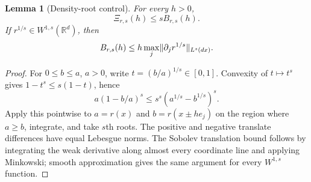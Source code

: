 \documentclass[11pt]{article}
\newtheorem{lemma}[theorem]{Lemma}
\theoremstyle{remark}\newtheorem{remark}[theorem]{Remark}
\newcommand{\R}{\mathbb R}\newcommand{\E}{\mathbb E}
\begin{document}
\begin{lemma}[Density-root control]\label{lem:root}
For every $h>0$,
\begin{equation}\label{eq:loss-root}
 \Xi_{r,s}(h)\le s B_{r,s}(h).
\end{equation}
If $r^{1/s}\in W^{1,s}(\R^d)$, then
\[
 B_{r,s}(h)\le h\max_j\lVert\partial_j r^{1/s}\rVert_{L^s(dx)}.
\]
\end{lemma}
\begin{proof}
For $0\le b\le a$, $a>0$, write $t=(b/a)^{1/s}\in[0,1]$. Convexity of $t\mapsto t^s$ gives $1-t^s\le s(1-t)$, hence
\[
 a(1-b/a)^s\le s^s(a^{1/s}-b^{1/s})^s.
\]
Apply this pointwise to $a=r(x)$ and $b=r(x\pm he_j)$ on the region where $a\ge b$, integrate, and take $s$th roots. The positive and negative translate differences have equal Lebesgue norms. The Sobolev translation bound follows by integrating the weak derivative along almost every coordinate line and applying Minkowski; smooth approximation gives the same argument for every $W^{1,s}$ function.
\end{proof}
\end{document}
